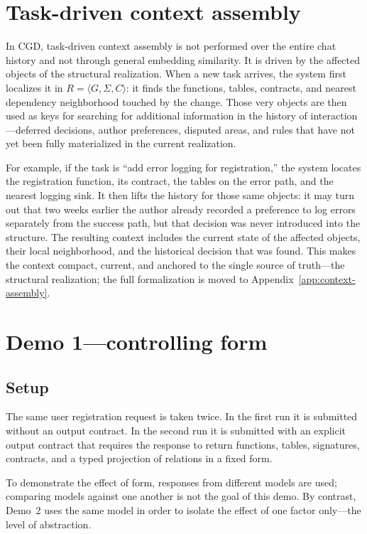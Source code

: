 \documentclass[12pt,a4paper]{article}
\begin{document}
\section{Task-driven context assembly}

In CGD, task-driven context assembly is not performed over the entire chat history and not through general embedding similarity. It is driven by the affected objects of the structural realization. When a new task arrives, the system first localizes it in $R = \langle G, \Sigma, C \rangle$: it finds the functions, tables, contracts, and nearest dependency neighborhood touched by the change. Those very objects are then used as keys for searching for additional information in the history of interaction---deferred decisions, author preferences, disputed areas, and rules that have not yet been fully materialized in the current realization.

For example, if the task is ``add error logging for registration,'' the system locates the registration function, its contract, the tables on the error path, and the nearest logging sink. It then lifts the history for those same objects: it may turn out that two weeks earlier the author already recorded a preference to log errors separately from the success path, but that decision was never introduced into the structure. The resulting context includes the current state of the affected objects, their local neighborhood, and the historical decision that was found. This makes the context compact, current, and anchored to the single source of truth---the structural realization; the full formalization is moved to Appendix~\ref{app:context-assembly}.

\section{Demo 1---controlling form}

\subsection{Setup}

The same user registration request is taken twice. In the first run it is submitted without an output contract. In the second run it is submitted with an explicit output contract that requires the response to return functions, tables, signatures, contracts, and a typed projection of relations in a fixed form.

To demonstrate the effect of form, responses from different models are used; comparing models against one another is not the goal of this demo. By contrast, Demo~2 uses the same model in order to isolate the effect of one factor only---the level of abstraction.
\end{document}
